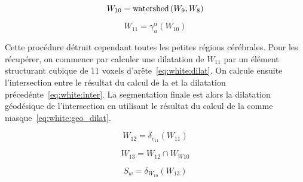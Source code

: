 \documentclass[\main/main.tex]{subfiles}
\begin{document}
\begin{equation}
\label{eq:white:watershed}
    W_{10} = \operatorname{\textnormal{watershed}}{}(W_9,W_8)
\end{equation}

\begin{equation}
\label{eq:white:open_volume}
    W_{11} = \gamma^{\alpha}_{u}(W_{10})
\end{equation}

%
Cette procédure détruit cependant toutes les petites régions cérébrales.
%
Pour les récupérer, on commence par calculer une dilatation de $W_{11}$ par un élément structurant cubique de 11 voxels d'arête~\eqref{eq:white:dilat}.
%
On calcule ensuite l'intersection entre le résultat du calcul de la \watershed{}
et la dilatation précedénte~\eqref{eq:white:inter}.
%
La segmentation finale est alors la dilatation géodésique de l'intersection en utilisant le résultat du calcul de la \watershed{} comme masque~\eqref{eq:white:geo_dilat}.

\begin{equation}
\label{eq:white:dilat}
    W_{12} = \delta_{c_{11}}(W_{11})
\end{equation}

\begin{equation}
\label{eq:white:inter}
    W_{13} = W_{12} \cap W_{W10}
\end{equation}

\begin{equation}
\label{eq:white:geo_dilat}
    S_w = \delta_{W_{10}}(W_{13})
\end{equation}
\end{document}
